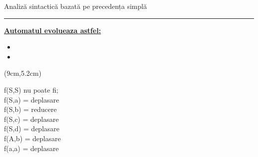 \documentclass[pdf]{beamer}
\begin{document}
\begin{frame}{Analiză sintactică bazată pe precedența simplă}
{\color{brown} \rule{\linewidth}{0.1mm} }



\textbf{\underline{Automatul evolueaza astfel:}}
\begin{itemize}
    \item {}
    
    \item {}
\end{itemize}
    
\begin{textblock*}{3.8cm}(9cm,5.2cm)
\end{textblock*}

f(S,S) nu poate fi;\\
f(S,a) = deplasare\\
f(S,b) = reducere\\
f(S,c) = deplasare\\
f(S,d) = deplasare\\
f(A,b) = deplasare\\
f(a,a) = deplasare\\

\end{frame}
\end{document}
